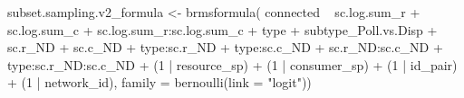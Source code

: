 \documentclass[11pt,]{article}
\newenvironment{Shaded}{}{}
\newcommand{\KeywordTok}[1]{\textcolor[rgb]{0.00,0.00,1.00}{#1}}
\newcommand{\DataTypeTok}[1]{#1}
\newcommand{\DecValTok}[1]{#1}
\newcommand{\StringTok}[1]{\textcolor[rgb]{0.00,0.50,0.50}{#1}}
\newcommand{\OperatorTok}[1]{#1}
\newcommand{\NormalTok}[1]{#1}
\begin{document}
\begin{Shaded}
\begin{Highlighting}[]
\NormalTok{subset.sampling.v2_formula <-}\StringTok{ }\KeywordTok{brmsformula}\NormalTok{(}
\NormalTok{  connected }\OperatorTok{~}\StringTok{ }\NormalTok{sc.log.sum_r }\OperatorTok{+}\StringTok{ }\NormalTok{sc.log.sum_c }\OperatorTok{+}\StringTok{ }\NormalTok{sc.log.sum_r}\OperatorTok{:}\NormalTok{sc.log.sum_c }\OperatorTok{+}
\StringTok{    }\NormalTok{type }\OperatorTok{+}\StringTok{ }\NormalTok{subtype_Poll.vs.Disp }\OperatorTok{+}\StringTok{ }\NormalTok{sc.r_ND }\OperatorTok{+}\StringTok{ }\NormalTok{sc.c_ND }\OperatorTok{+}
\StringTok{    }\NormalTok{type}\OperatorTok{:}\NormalTok{sc.r_ND }\OperatorTok{+}\StringTok{ }\NormalTok{type}\OperatorTok{:}\NormalTok{sc.c_ND }\OperatorTok{+}\StringTok{ }\NormalTok{sc.r_ND}\OperatorTok{:}\NormalTok{sc.c_ND }\OperatorTok{+}
\StringTok{    }\NormalTok{type}\OperatorTok{:}\NormalTok{sc.r_ND}\OperatorTok{:}\NormalTok{sc.c_ND }\OperatorTok{+}
\StringTok{    }\NormalTok{(}\DecValTok{1} \OperatorTok{|}\StringTok{ }\NormalTok{resource_sp) }\OperatorTok{+}\StringTok{ }\NormalTok{(}\DecValTok{1} \OperatorTok{|}\StringTok{ }\NormalTok{consumer_sp) }\OperatorTok{+}\StringTok{ }\NormalTok{(}\DecValTok{1} \OperatorTok{|}\StringTok{ }\NormalTok{id_pair) }\OperatorTok{+}\StringTok{ }\NormalTok{(}\DecValTok{1} \OperatorTok{|}\StringTok{ }\NormalTok{network_id),}
  \DataTypeTok{family =} \KeywordTok{bernoulli}\NormalTok{(}\DataTypeTok{link =} \StringTok{"logit"}\NormalTok{))}


\end{Highlighting}
\end{Shaded}
\end{document}
